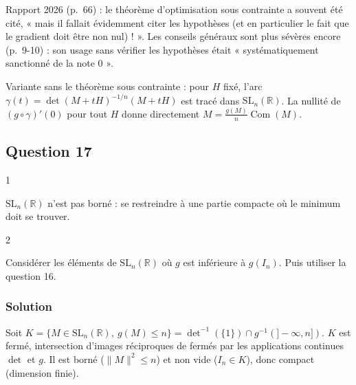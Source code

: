 \documentclass[11pt,a4paper]{article}
\begin{document}
\begin{jury}

Rapport 2026 (p.~66) : le théorème d'optimisation sous contrainte a souvent été cité, « mais il fallait évidemment citer les hypothèses (et en particulier le fait que le gradient doit être non nul) ! ». Les conseils généraux sont plus sévères encore (p.~9-10) : son usage sans vérifier les hypothèses était « systématiquement sanctionné de la note 0 ».

\end{jury}

\begin{methode}

Variante sans le théorème sous contrainte : pour \(H\) fixé, l'arc \(\gamma(t)=\det(M+tH)^{-1/n}(M+tH)\) est tracé dans \({\mathrm{SL}}_n(\mathbb{R})\). La nullité de \((g\circ\gamma)'(0)\) pour tout \(H\) donne directement \(M=\frac{g(M)}{n}\operatorname{Com}(M)\).

\end{methode}

\hypertarget{question-17}{%
\subsection{Question 17}\label{question-17}}

\begin{indication}{1}

\({\mathrm{SL}}_n(\mathbb{R})\) n'est pas borné : se restreindre à une partie compacte où le minimum doit se trouver.

\end{indication}

\begin{indication}{2}

Considérer les éléments de \({\mathrm{SL}}_n(\mathbb{R})\) où \(g\) est inférieure à \(g(I_n)\). Puis utiliser la question 16.

\end{indication}

\hypertarget{solution-16}{%
\subsubsection{Solution}\label{solution-16}}

Soit \(K=\{M\in{\mathrm{SL}}_n(\mathbb{R}),\allowbreak \ g(M)\le n\}=\det^{-1}(\{1\})\cap g^{-1}(]-\infty,\allowbreak n])\). \(K\) est fermé, intersection d'images réciproques de fermés par les applications continues \(\det\) et \(g\). Il est borné (\(\|M\|^2\le n\)) et non vide (\(I_n\in K\)), donc compact (dimension finie).
\end{document}
